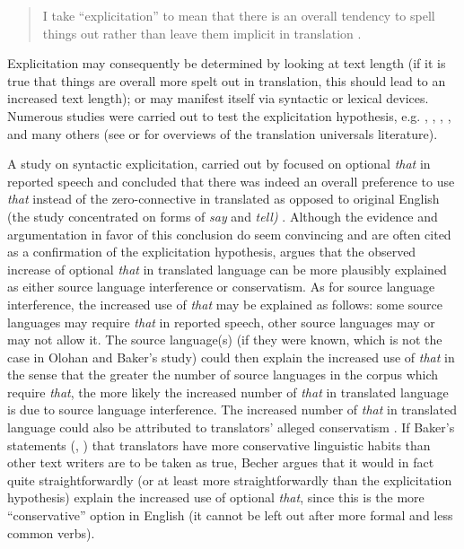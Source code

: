 \begin{quote}
I take “explicitation” to mean that there is an overall tendency to spell things out rather than leave them implicit in translation \citep[180]{baker_corpus-based_1996}.
\end{quote}

Explicitation may consequently be determined by looking at text length (if it is true that things are overall more spelt out in translation, this should lead to an increased text length); or may manifest itself via syntactic or lexical devices. Numerous studies were carried out to test the explicitation hypothesis, e.g. \citet{overas_search_1998}, \citet{olohan_reporting_2000}, \citet{olohan_how_2003}, \citet{mutesayire_apposition_2004}, \citet{mauranen_explicitation_2004} and many others (see \citealt{Kruger2012} or \citealt{zanettin_corpus_2013} for overviews of the translation universals literature).

A study on syntactic explicitation, carried out by \citet{olohan_reporting_2000} focused on optional \textit{that} in reported speech and concluded that there was indeed an overall preference to use \textit{that} instead of the zero-connective in translated as opposed to original English (the study concentrated on forms of \textit{say} and \textit{tell)} \citep[157]{olohan_reporting_2000}. Although the evidence and argumentation in favor of this conclusion do seem convincing and are often cited as a confirmation of the explicitation hypothesis, \citet[10--11]{becher_abandoning_2010} argues that the observed increase of optional \textit{that} in translated language can be more plausibly explained as either source language interference or conservatism. As for source language interference, the increased use of \textit{that} may be explained as follows: some source languages may require \textit{that} in reported speech, other source languages may or may not allow it. The source language(s) (if they were known, which is not the case in Olohan and Baker’s study) could then explain the increased use of \textit{that} in the sense that the greater the number of source languages in the corpus which require \textit{that}, the more likely the increased number of \textit{that} in translated language is due to source language interference. The increased number of \textit{that} in translated language could also be attributed to translators’ alleged conservatism \citep{becher_abandoning_2010}. If Baker’s statements (\citealt[244]{baker_corpus_1993}, \citealt[183]{baker_corpus-based_1996}) that translators have more conservative linguistic habits than other text writers are to be taken as true, Becher argues that it would in fact quite straightforwardly (or at least more straightforwardly than the explicitation hypothesis) explain the increased use of optional \textit{that}, since this is the more ``conservative'' option in English (it cannot be left out after more formal and less common verbs).

